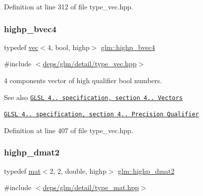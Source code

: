 Definition at line 312 of file type\+\_\+vec.\+hpp.

\mbox{\label{group__core__precision_gaa99e0301060bf06e7750c1c3591b6b4e}} 
\subsubsection{\texorpdfstring{highp\+\_\+bvec4}{highp\_bvec4}}
{\footnotesize\ttfamily typedef \hyperlink{structglm_1_1vec}{vec}$<$4, bool, highp$>$ \hyperlink{group__core__precision_gaa99e0301060bf06e7750c1c3591b6b4e}{glm\+::highp\+\_\+bvec4}}



{\ttfamily \#include $<$\hyperlink{type__vec_8hpp}{deps/glm/detail/type\+\_\+vec.\+hpp}$>$}

4 components vector of high qualifier bool numbers.

\begin{DoxySeeAlso}{See also}
\href{http://www.opengl.org/registry/doc/GLSLangSpec.4.20.8.pdf}{\tt G\+L\+SL 4.. specification, section 4.. Vectors} 

\href{http://www.opengl.org/registry/doc/GLSLangSpec.4.20.8.pdf}{\tt G\+L\+SL 4.. specification, section 4.. Precision Qualifier} 
\end{DoxySeeAlso}


Definition at line 407 of file type\+\_\+vec.\+hpp.

\mbox{\label{group__core__precision_ga10defb0dfd989f948d6783e2ca3889d3}} 
\subsubsection{\texorpdfstring{highp\+\_\+dmat2}{highp\_dmat2}}
{\footnotesize\ttfamily typedef \hyperlink{structglm_1_1mat}{mat}$<$2, 2, double, highp$>$ \hyperlink{group__core__precision_ga10defb0dfd989f948d6783e2ca3889d3}{glm\+::highp\+\_\+dmat2}}



{\ttfamily \#include $<$\hyperlink{type__mat_8hpp}{deps/glm/detail/type\+\_\+mat.\+hpp}$>$}

